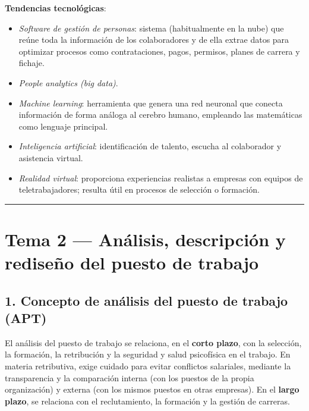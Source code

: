 \documentclass[12pt]{book} %
\providecommand{\tightlist}{%
  \setlength{\itemsep}{0pt}\setlength{\parskip}{0pt}}
\begin{document}
\textbf{Tendencias tecnológicas}:

\begin{itemize}
\tightlist
\item
  \emph{Software de gestión de personas}: sistema (habitualmente en la
  nube) que reúne toda la información de los colaboradores y de ella
  extrae datos para optimizar procesos como contrataciones, pagos,
  permisos, planes de carrera y fichaje.
\item
  \emph{People analytics (big data)}.
\item
  \emph{Machine learning}: herramienta que genera una red neuronal que
  conecta información de forma análoga al cerebro humano, empleando las
  matemáticas como lenguaje principal.
\item
  \emph{Inteligencia artificial}: identificación de talento, escucha al
  colaborador y asistencia virtual.
\item
  \emph{Realidad virtual}: proporciona experiencias realistas a empresas
  con equipos de teletrabajadores; resulta útil en procesos de selección
  o formación.
\end{itemize}

\begin{center}\rule{0.5\linewidth}{0.5pt}\end{center}

\hypertarget{tema-2-anuxe1lisis-descripciuxf3n-y-rediseuxf1o-del-puesto-de-trabajo}{%
\chapter{Tema 2 --- Análisis, descripción y rediseño del puesto de
trabajo}\label{tema-2-anuxe1lisis-descripciuxf3n-y-rediseuxf1o-del-puesto-de-trabajo}}

\hypertarget{concepto-de-anuxe1lisis-del-puesto-de-trabajo-apt}{%
\section{1. Concepto de análisis del puesto de trabajo
(APT)}\label{concepto-de-anuxe1lisis-del-puesto-de-trabajo-apt}}

El análisis del puesto de trabajo se relaciona, en el \textbf{corto
plazo}, con la selección, la formación, la retribución y la seguridad y
salud psicofísica en el trabajo. En materia retributiva, exige cuidado
para evitar conflictos salariales, mediante la transparencia y la
comparación interna (con los puestos de la propia organización) y
externa (con los mismos puestos en otras empresas). En el \textbf{largo
plazo}, se relaciona con el reclutamiento, la formación y la gestión de
carreras.
\end{document}
